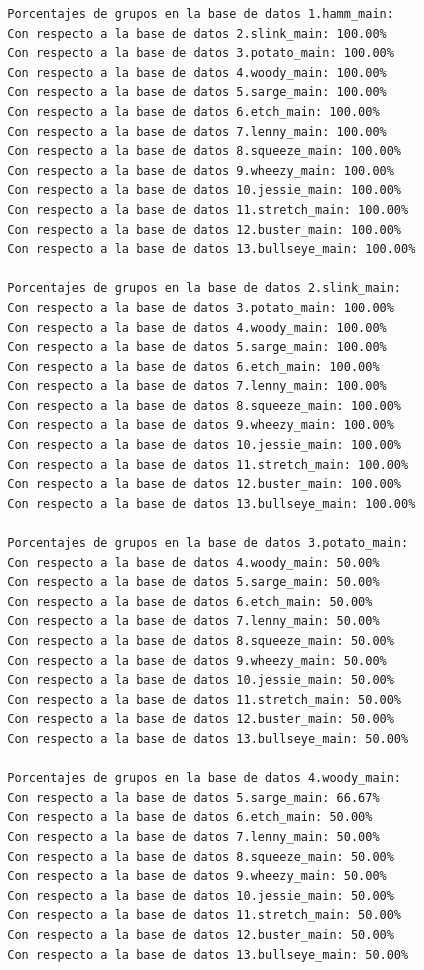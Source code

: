 \documentclass[a4paper, 12pt]{book}
\begin{document}
		\begin{verbatim}
		Porcentajes de grupos en la base de datos 1.hamm_main:
		Con respecto a la base de datos 2.slink_main: 100.00%
		Con respecto a la base de datos 3.potato_main: 100.00%
		Con respecto a la base de datos 4.woody_main: 100.00%
		Con respecto a la base de datos 5.sarge_main: 100.00%
		Con respecto a la base de datos 6.etch_main: 100.00%
		Con respecto a la base de datos 7.lenny_main: 100.00%
		Con respecto a la base de datos 8.squeeze_main: 100.00%
		Con respecto a la base de datos 9.wheezy_main: 100.00%
		Con respecto a la base de datos 10.jessie_main: 100.00%
		Con respecto a la base de datos 11.stretch_main: 100.00%
		Con respecto a la base de datos 12.buster_main: 100.00%
		Con respecto a la base de datos 13.bullseye_main: 100.00%
		
		Porcentajes de grupos en la base de datos 2.slink_main:
		Con respecto a la base de datos 3.potato_main: 100.00%
		Con respecto a la base de datos 4.woody_main: 100.00%
		Con respecto a la base de datos 5.sarge_main: 100.00%
		Con respecto a la base de datos 6.etch_main: 100.00%
		Con respecto a la base de datos 7.lenny_main: 100.00%
		Con respecto a la base de datos 8.squeeze_main: 100.00%
		Con respecto a la base de datos 9.wheezy_main: 100.00%
		Con respecto a la base de datos 10.jessie_main: 100.00%
		Con respecto a la base de datos 11.stretch_main: 100.00%
		Con respecto a la base de datos 12.buster_main: 100.00%
		Con respecto a la base de datos 13.bullseye_main: 100.00%
		
		Porcentajes de grupos en la base de datos 3.potato_main:
		Con respecto a la base de datos 4.woody_main: 50.00%
		Con respecto a la base de datos 5.sarge_main: 50.00%
		Con respecto a la base de datos 6.etch_main: 50.00%
		Con respecto a la base de datos 7.lenny_main: 50.00%
		Con respecto a la base de datos 8.squeeze_main: 50.00%
		Con respecto a la base de datos 9.wheezy_main: 50.00%
		Con respecto a la base de datos 10.jessie_main: 50.00%
		Con respecto a la base de datos 11.stretch_main: 50.00%
		Con respecto a la base de datos 12.buster_main: 50.00%
		Con respecto a la base de datos 13.bullseye_main: 50.00%
		
		Porcentajes de grupos en la base de datos 4.woody_main:
		Con respecto a la base de datos 5.sarge_main: 66.67%
		Con respecto a la base de datos 6.etch_main: 50.00%
		Con respecto a la base de datos 7.lenny_main: 50.00%
		Con respecto a la base de datos 8.squeeze_main: 50.00%
		Con respecto a la base de datos 9.wheezy_main: 50.00%
		Con respecto a la base de datos 10.jessie_main: 50.00%
		Con respecto a la base de datos 11.stretch_main: 50.00%
		Con respecto a la base de datos 12.buster_main: 50.00%
		Con respecto a la base de datos 13.bullseye_main: 50.00%
		

\end{verbatim}
\end{document}
